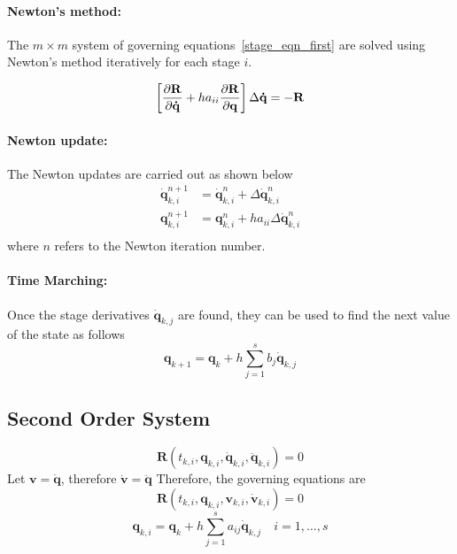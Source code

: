 \documentclass[pdftex,11pt,letter]{article}
\begin{document}
\begin{multicols}{2}
\paragraph{Newton's method:}

The $m \times m$ system of governing equations~\eqref{stage_eqn_first}
are solved using Newton's method iteratively for each stage $i$.

\begin{equation}
\left[\dfrac{\partial \mathbf{R}}{\partial \mathbf{\dot{q}}} + h a_{ii}
  \dfrac{\partial \mathbf{R}}{\partial \mathbf{q}}\right] \Delta\mathbf{\dot{q}} = -\mathbf{R}
\end{equation}

\paragraph{Newton update:}
The Newton updates are carried out as shown below
\begin{equation}\label{newton_update}
  \begin{split}
    \mathbf{\dot{q}}_{k,i}^{n+1} & = \mathbf{\dot{q}}_{k,i}^{n} +
    \Delta\mathbf{\dot{q}}_{k,i}^{n} \\
    \mathbf{q}_{k,i}^{n+1} & = \mathbf{q}_{k,i}^n + h a_{ii}
    \Delta\mathbf{\dot{q}}_{k,i}^n \\
  \end{split}
\end{equation}
where $n$ refers to the Newton iteration number.

\paragraph{Time Marching:}

Once the stage derivatives $\mathbf{\dot{q}}_{k,j}$ are found, they can
be used to find the next value of the state as follows
\begin{equation}
  \mathbf{q}_{k+1} = \mathbf{q}_{k} +h \sum_{j=1}^s b_j \mathbf{\dot{q}}_{k,j}
\end{equation}

\subsection{Second Order System}

\begin{equation}
  \mathbf{R}\left(t_{k,i}, \mathbf{q}_{k,i}, \mathbf{\dot{q}}_{k,i},
  \mathbf{\ddot{q}}_{k,i}\right) = 0
\end{equation}
Let $\mathbf{v}=\mathbf{\dot{q}}$, therefore $\mathbf{\dot{v}}=\mathbf{\ddot{q}}$
Therefore, the governing equations are
\begin{equation}
  \mathbf{R}\left(t_{k,i}, \mathbf{q}_{k,i}, \mathbf{v}_{k,i}, \mathbf{\dot{v}}_{k,i}\right) = 0
\end{equation}
\begin{equation}
  \mathbf{q}_{k,i} = \mathbf{q}_{k} + h \sum_{j=1}^s a_{ij} \mathbf{\dot{q}}_{k,j} \quad i = 1,\ldots,s 
\end{equation}


\end{multicols}
\end{document}
